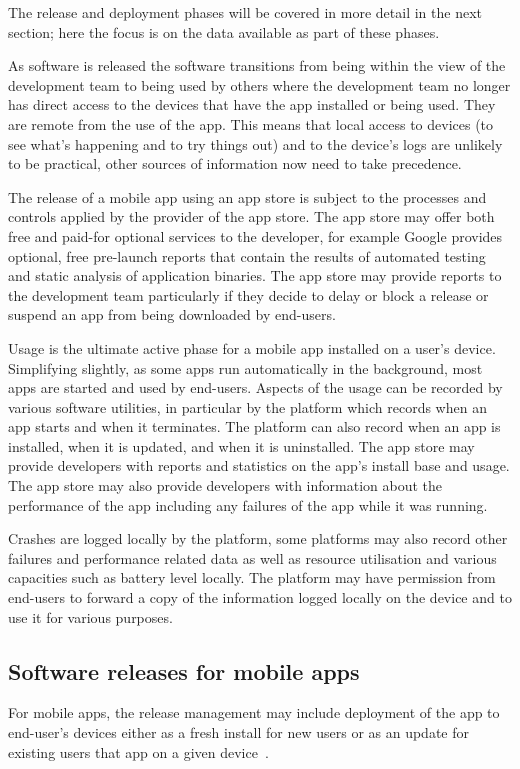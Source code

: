 The release and deployment phases will be covered in more detail in the next section; here the focus is on the data available as part of these phases. 

As software is released the software transitions from being within the view of the development team to being used by others where the development team no longer has direct access to the devices that have the app installed or being used. They are remote from the use of the app. This means that local access to devices (to see what's happening and to try things out) and to the device's logs are unlikely to be practical, other sources of information now need to take precedence.

The release of a mobile app using an app store is subject to the processes and controls applied by the provider of the app store. The app store may offer both free and paid-for optional services to the developer, for example Google provides optional, free pre-launch reports that contain the results of automated testing and static analysis of application binaries. The app store may provide reports to the development team particularly if they decide to delay or block a release or suspend an app from being downloaded by end-users.

Usage is the ultimate active phase for a mobile app installed on a user's device. Simplifying slightly, as some apps run automatically in the background, most apps are started and used by end-users. Aspects of the usage can be recorded by various software utilities, in particular by the platform which records when an app starts and when it terminates. The platform can also record when an app is installed, when it is updated, and when it is uninstalled. The app store may provide developers with reports and statistics on the app's install base and usage. The app store may also provide developers with information about the performance of the app including any failures of the app while it was running.

Crashes are logged locally by the platform, some platforms may also record other failures and performance related data as well as resource utilisation and various capacities such as battery level locally. The platform may have permission from end-users to forward a copy of the information logged locally on the device and to use it for various purposes.  

\subsection{Software releases for mobile apps}
For mobile apps, the release management may include deployment of the app to end-user's devices either as a fresh install for new users or as an update for existing users that app on a given device~.

